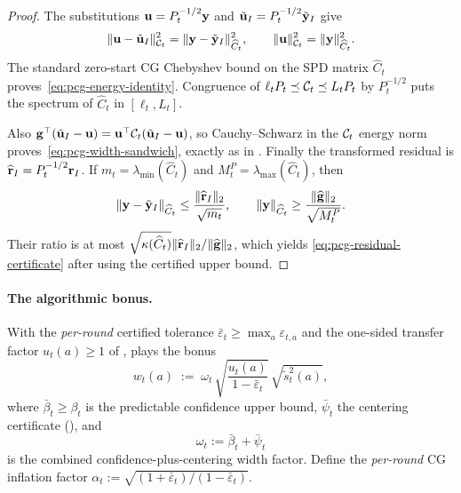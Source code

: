 \begin{proof}
The substitutions $\mathbf{u}=P_t^{-1/2}\mathbf{y}$ and
$\tilde{\mathbf{u}}_I=P_t^{-1/2}\tilde{\mathbf{y}}_I$ give
\[
 \|\mathbf{u}-\tilde{\mathbf{u}}_I\|_{\mathcal{C}_t}^2
 =\|\mathbf{y}-\tilde{\mathbf{y}}_I\|_{\widehat C_t}^2,
 \qquad
 \|\mathbf{u}\|_{\mathcal{C}_t}^2=\|\mathbf{y}\|_{\widehat C_t}^2.
\]
The standard zero-start CG Chebyshev bound on the SPD matrix $\widehat C_t$
proves~\eqref{eq:pcg-energy-identity}.  Congruence of
$\ell_tP_t\preceq\mathcal{C}_t\preceq L_tP_t$ by $P_t^{-1/2}$ puts the spectrum of
$\widehat C_t$ in $[\ell_t,L_t]$.

Also
$\mathbf{g}^\top(\tilde{\mathbf{u}}_I-\mathbf{u})=
\mathbf{u}^\top\mathcal{C}_t(\tilde{\mathbf{u}}_I-\mathbf{u})$, so Cauchy--Schwarz in the
$\mathcal{C}_t$ energy norm proves~\eqref{eq:pcg-width-sandwich}, exactly as in
.  Finally the transformed residual is
$\widehat{\mathbf{r}}_I=P_t^{-1/2}\mathbf{r}_I$.  If
$m_t=\lambda_{\min}(\widehat C_t)$ and
$M_t^P=\lambda_{\max}(\widehat C_t)$, then
\[
 \|\mathbf{y}-\tilde{\mathbf{y}}_I\|_{\widehat C_t}
 \le\frac{\|\widehat{\mathbf{r}}_I\|_2}{\sqrt{m_t}},
 \qquad
 \|\mathbf{y}\|_{\widehat C_t}
 \ge\frac{\|\widehat{\mathbf{g}}\|_2}{\sqrt{M_t^P}}.
\]
Their ratio is at most
$\sqrt{\kappa(\widehat C_t)}
\|\widehat{\mathbf{r}}_I\|_2/\|\widehat{\mathbf{g}}\|_2$, which yields
\eqref{eq:pcg-residual-certificate} after using the certified upper bound.
\end{proof}
\fi

\paragraph{The algorithmic bonus.}
With the \emph{per-round} certified tolerance
$\bar\varepsilon_t\ge\max_a\varepsilon_{t,a}$ and the one-sided transfer factor
$u_t(a)\ge1$ of ,  plays the bonus
\begin{equation}\label{eq:bonus}
  w_t(a)
  \;:=\;
  \omega_t\,
  \sqrt{\frac{u_t(a)}{1-\bar\varepsilon_t}}\,
  \sqrt{\tilde{s}_t^2(a)},
\end{equation}
where $\bar\beta_t\ge\beta_t$ is the predictable confidence upper bound,
$\bar\psi_t$ the centering certificate (), and
\begin{equation}\label{eq:omega-def}
  \omega_t := \bar\beta_t+\bar\psi_t
\end{equation}
is the combined confidence-plus-centering width factor.  Define the
\emph{per-round} CG inflation factor
$\alpha_t:=\sqrt{(1+\bar\varepsilon_t)/(1-\bar\varepsilon_t)}$.

